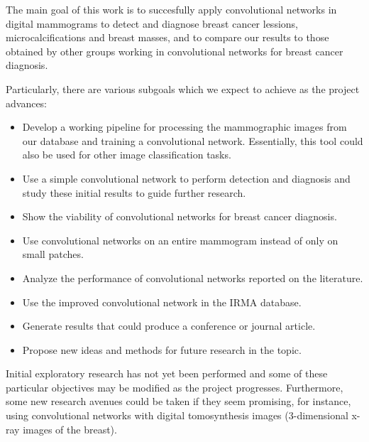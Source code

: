 The main goal of this work is to succesfully apply convolutional networks in digital mammograms to detect and diagnose breast cancer lessions, microcalcifications and breast masses, and to compare our results to those obtained by other groups working in convolutional networks for breast cancer diagnosis.

Particularly, there are various subgoals which we expect to achieve as the project advances:
\begin{itemize}
	\item Develop a working pipeline for processing the mammographic images from our database and training a convolutional network. Essentially, this tool could also be used for other image classification tasks.
	\item Use a simple convolutional network to perform detection and diagnosis and study these initial results to guide further research.
	\item Show the viability of convolutional networks for breast cancer diagnosis.
	\item Use convolutional networks on an entire mammogram instead of only on small patches.
	\item Analyze the performance of convolutional networks reported on the literature.
	\item Use the improved convolutional network in the IRMA database.
	\item Generate results that could produce a conference or journal article.
	\item Propose new ideas and methods for future research in the topic.
\end{itemize}
Initial exploratory research has not yet been performed and some of these particular objectives may be modified as the project progresses. Furthermore, some new research avenues could be taken if they seem promising, for instance, using convolutional networks with digital tomosynthesis images (3-dimensional x-ray images of the breast).


